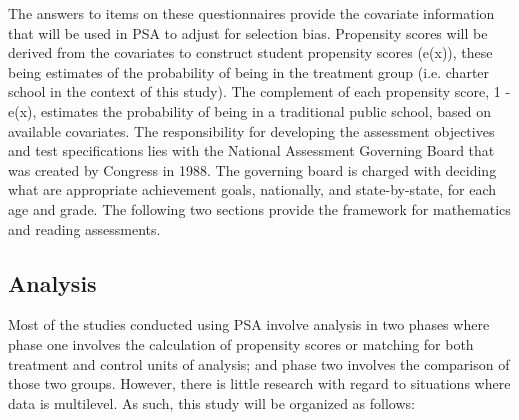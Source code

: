\documentclass[letterpaper,12pt]{article}
\begin{document}
The answers to items on these questionnaires provide the covariate information that will be used in PSA to adjust for selection bias. Propensity scores will be derived from the covariates to construct student propensity scores (e(x)), these being estimates of the probability of being in the treatment group (i.e. charter school in the context of this study). The complement of each propensity score, 1 - e(x), estimates the probability of being in a traditional public school, based on available covariates. The responsibility for developing the assessment objectives and test specifications lies with the National Assessment Governing Board that was created by Congress in 1988. The governing board is charged with deciding what are appropriate achievement goals, nationally, and state-by-state, for each age and grade. The following two sections provide the framework for mathematics and reading assessments.

\subsection{Analysis}
Most of the studies conducted using PSA involve analysis in two phases where phase one involves the calculation of propensity scores or matching for both treatment and control units of analysis; and phase two involves the comparison of those two groups. However, there is little research with regard to situations where data is multilevel. As such, this study will be organized as follows:
\end{document}
